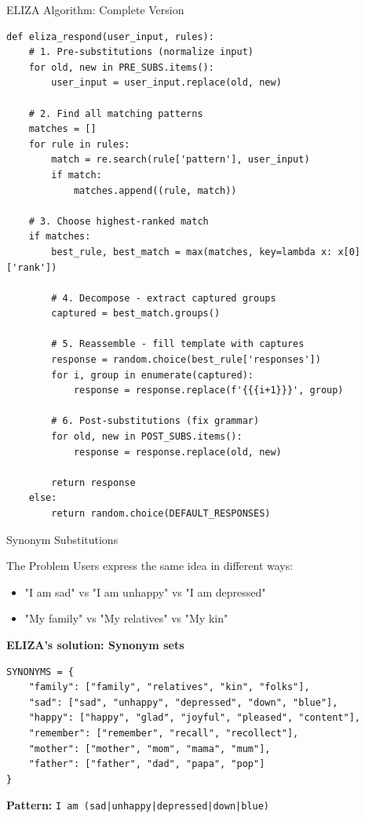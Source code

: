 \documentclass[aspectratio=169]{beamer}
\begin{document}
\begin{frame}[fragile]{ELIZA Algorithm: Complete Version 🔧}
\begin{lstlisting}[basicstyle=\ttfamily\tiny]
def eliza_respond(user_input, rules):
    # 1. Pre-substitutions (normalize input)
    for old, new in PRE_SUBS.items():
        user_input = user_input.replace(old, new)

    # 2. Find all matching patterns
    matches = []
    for rule in rules:
        match = re.search(rule['pattern'], user_input)
        if match:
            matches.append((rule, match))

    # 3. Choose highest-ranked match
    if matches:
        best_rule, best_match = max(matches, key=lambda x: x[0]['rank'])

        # 4. Decompose - extract captured groups
        captured = best_match.groups()

        # 5. Reassemble - fill template with captures
        response = random.choice(best_rule['responses'])
        for i, group in enumerate(captured):
            response = response.replace(f'{{{i+1}}}', group)

        # 6. Post-substitutions (fix grammar)
        for old, new in POST_SUBS.items():
            response = response.replace(old, new)

        return response
    else:
        return random.choice(DEFAULT_RESPONSES)
\end{lstlisting}
\end{frame}

\begin{frame}[fragile]{Synonym Substitutions 📝}
\begin{block}{The Problem}
Users express the same idea in different ways:
\begin{itemize}\setlength{\itemsep}{0pt}
    \item "I am sad" vs "I am unhappy" vs "I am depressed"
    \item "My family" vs "My relatives" vs "My kin"
\end{itemize}
\end{block}

\vspace{0.3cm}

\textbf{ELIZA's solution: Synonym sets}

\begin{lstlisting}
SYNONYMS = {
    "family": ["family", "relatives", "kin", "folks"],
    "sad": ["sad", "unhappy", "depressed", "down", "blue"],
    "happy": ["happy", "glad", "joyful", "pleased", "content"],
    "remember": ["remember", "recall", "recollect"],
    "mother": ["mother", "mom", "mama", "mum"],
    "father": ["father", "dad", "papa", "pop"]
}
\end{lstlisting}

\vspace{0.3cm}

\textbf{Pattern:} \texttt{I am (sad|unhappy|depressed|down|blue)}
\end{frame}
\end{document}
